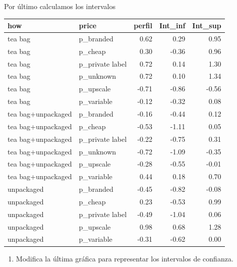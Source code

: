 \documentclass[]{article}
\newenvironment{Shaded}{\begin{snugshade}}{\end{snugshade}}
\newcommand{\DataTypeTok}[1]{\textcolor[rgb]{0.13,0.29,0.53}{#1}}
\newcommand{\DecValTok}[1]{\textcolor[rgb]{0.00,0.00,0.81}{#1}}
\newcommand{\FloatTok}[1]{\textcolor[rgb]{0.00,0.00,0.81}{#1}}
\newcommand{\KeywordTok}[1]{\textcolor[rgb]{0.13,0.29,0.53}{\textbf{#1}}}
\newcommand{\NormalTok}[1]{#1}
\newcommand{\OperatorTok}[1]{\textcolor[rgb]{0.81,0.36,0.00}{\textbf{#1}}}
\newcommand{\StringTok}[1]{\textcolor[rgb]{0.31,0.60,0.02}{#1}}
\providecommand{\tightlist}{%
  \setlength{\itemsep}{0pt}\setlength{\parskip}{0pt}}
\begin{document}
Por último calculamos los intervalos

\begin{Shaded}
\end{Shaded}

\begin{longtable}[]{@{}llrrr@{}}
\toprule
how & price & perfil & Int\_inf & Int\_sup\tabularnewline
\midrule
\endhead
tea bag & p\_branded & 0.62 & 0.29 & 0.95\tabularnewline
tea bag & p\_cheap & 0.30 & -0.36 & 0.96\tabularnewline
tea bag & p\_private label & 0.72 & 0.14 & 1.30\tabularnewline
tea bag & p\_unknown & 0.72 & 0.10 & 1.34\tabularnewline
tea bag & p\_upscale & -0.71 & -0.86 & -0.56\tabularnewline
tea bag & p\_variable & -0.12 & -0.32 & 0.08\tabularnewline
tea bag+unpackaged & p\_branded & -0.16 & -0.44 & 0.12\tabularnewline
tea bag+unpackaged & p\_cheap & -0.53 & -1.11 & 0.05\tabularnewline
tea bag+unpackaged & p\_private label & -0.22 & -0.75 &
0.31\tabularnewline
tea bag+unpackaged & p\_unknown & -0.72 & -1.09 & -0.35\tabularnewline
tea bag+unpackaged & p\_upscale & -0.28 & -0.55 & -0.01\tabularnewline
tea bag+unpackaged & p\_variable & 0.44 & 0.18 & 0.70\tabularnewline
unpackaged & p\_branded & -0.45 & -0.82 & -0.08\tabularnewline
unpackaged & p\_cheap & 0.23 & -0.53 & 0.99\tabularnewline
unpackaged & p\_private label & -0.49 & -1.04 & 0.06\tabularnewline
unpackaged & p\_upscale & 0.98 & 0.68 & 1.28\tabularnewline
unpackaged & p\_variable & -0.31 & -0.62 & 0.00\tabularnewline
\bottomrule
\end{longtable}

\begin{enumerate}
\def\labelenumi{\arabic{enumi}.}
\setcounter{enumi}{1}
\tightlist
\item
  Modifica la última gráfica para representar los intervalos de
  confianza.
\end{enumerate}
\end{document}
